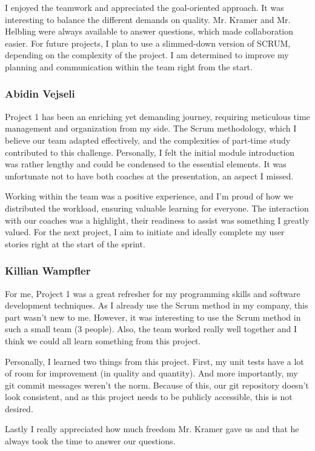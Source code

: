 I enjoyed the teamwork and appreciated the goal-oriented approach.
It was interesting to balance the different demands on quality.
Mr. Kramer and Mr. Helbling were always available to answer questions, which made collaboration easier.
For future projects, I plan to use a slimmed-down version of SCRUM, depending on the complexity of the project.
I am determined to improve my planning and communication within the team right from the start.

\subsubsection{Abidin Vejseli}
Project 1 has been an enriching yet demanding journey, requiring meticulous time management and organization from my side.
The Scrum methodology, which I believe our team adapted effectively, and the complexities of part-time study contributed to this challenge.
Personally, I felt the initial module introduction was rather lengthy and could be condensed to the essential elements.
It was unfortunate not to have both coaches at the presentation, an aspect I missed.

Working within the team was a positive experience, and I'm proud of how we distributed the workload, ensuring valuable learning for everyone.
The interaction with our coaches was a highlight, their readiness to assist was something I greatly valued.
For the next project, I aim to initiate and ideally complete my user stories right at the start of the sprint.

\subsubsection{Killian Wampfler}
For me, Project 1 was a great refresher for my programming skills and software development techniques. As I already use the Scrum method in my company, this part wasn't new to me.
However, it was interesting to use the Scrum method in such a small team (3 people). Also, the team worked really well together and I think we could all learn something from this project.

Personally, I learned two things from this project. First, my unit tests have a lot of room for improvement (in quality and quantity).
And more importantly, my git commit messages weren't the norm. Because of this, our git repository doesn't look consistent, and as this project needs to be publicly accessible, this is not desired.

Lastly I really appreciated how much freedom Mr. Kramer gave us and that he always took the time to answer our questions.